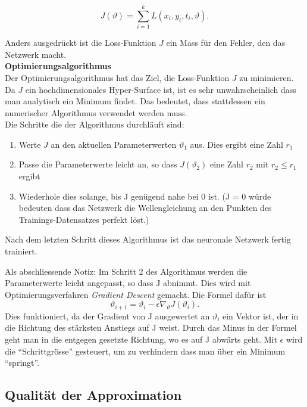\begin{equation}
    J(\vartheta) = \sum_{i=1}^{k} L(x_i, y_i, t_i, \vartheta).
    \label{neuronal:loss}
\end{equation}

Anders ausgedrückt ist die Loss-Funktion \( J \) ein Mass für den Fehler, den das Netzwerk macht.\\

\textbf{Optimierungsalgorithmus}\\
Der Optimierungsalgorithmus hat das Ziel, die Loss-Funktion \( J \) zu minimieren.
Da \( J \) ein hochdimensionales Hyper-Surface ist, ist es sehr unwahrscheinlich dass man analytisch ein Minimum findet.
Das bedeutet, dass stattdessen ein numerischer Algorithmus verwendet werden muss.\\

Die Schritte die der Algorithmus durchläuft sind:
\begin{enumerate}
    \item Werte \( J \) an den aktuellen Parameterwerten \( \vartheta_1 \) aus. Dies ergibt eine Zahl \( r_1 \)
    \item Passe die Parameterwerte leicht an, so dass \( J(\vartheta_2) \) eine Zahl \( r_2 \) mit \( r_2 \leq r_1 \) ergibt
    \item Wiederhole dies solange, bis J genügend nahe bei 0 ist. (J = 0 würde bedeuten dass das Netzwerk die Wellengleichung an den Punkten des Trainings-Datensatzes perfekt löst.)
\end{enumerate}

Nach dem letzten Schritt dieses Algorithmus ist das neuronale Netzwerk fertig trainiert.

Als abschliessende Notiz: Im Schritt 2 des Algorithmus werden die Parameterwerte leicht angepasst, so dass J abnimmt.
Dies wird mit Optimierungsverfahren \emph{Gradient Descent} gemacht. Die Formel dafür ist
\begin{equation}
    \vartheta_{i+1} = \vartheta_i - \epsilon \nabla_\vartheta J\left(\vartheta_i\right).
\end{equation}
Dies funktioniert, da der Gradient von J ausgewertet an \( \vartheta_i \) ein Vektor ist, der in die Richtung des stärksten Anstiegs auf J weist.
Durch das Minus in der Formel geht man in die entgegen gesetzte Richtung, wo es auf J abwärts geht. 
Mit \( \epsilon \) wird die ``Schrittgrösse'' gesteuert, um zu verhindern dass man über ein Minimum ``springt''.


\subsection{Qualität der Approximation}\label{neuronal:subsection:qualität_nn}
